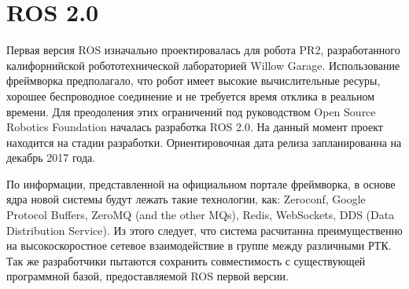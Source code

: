 \section{ROS 2.0}

Первая версия ROS изначально проектировалась для робота PR2, разработанного калифорнийской робототехнической лабораторией Willow Garage. Использование фреймворка предполагало, что робот имеет высокие вычислительные ресуры, хорошее беспроводное соединение и не требуется время отклика в реальном времени. Для преодоления этих ограничений под руководством Open Source Robotics Foundation началась разработка ROS 2.0. На данный момент проект находится на стадии разработки. Ориентировочная дата релиза запланированна на декабрь 2017 года.

По информации, представленной на официальном портале фреймворка, в основе ядра 
новой системы будут лежать такие технологии, как: Zeroconf, Google Protocol 
Buffers, ZeroMQ (and the other MQs), Redis, WebSockets, DDS (Data Distribution 
Service). Из этого следует, что система расчитанна преимущественно на 
высокоскоростное сетевое взаимодействие в группе между различными РТК. Так же 
разработчики пытаются сохранить совместимость с существующей программной базой, 
предоставляемой ROS первой версии.